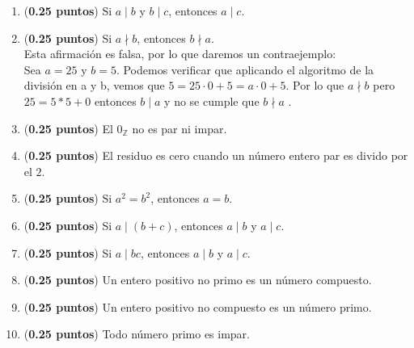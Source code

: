 \documentclass[fontsize=12pt]{scrartcl}
\begin{document}
\begin{enumerate}
		\item ({\bf 0.25 puntos})
		Si $a \mid b$ y $b \mid c$, entonces $a \mid c$.

		\item ({\bf 0.25 puntos})
		  Si $a \nmid b$, entonces $b \nmid a$. \\
                  Esta afirmación es falsa, por lo que daremos un contraejemplo: \\
                  Sea $a=25$ y  $b=5$. Podemos verificar que aplicando el algoritmo de la división en a y b, vemos que $5 = 25 \cdot 0 + 5 = a \cdot 0 +5 $. Por lo que $a \nmid b$ pero $25 = 5 * 5 +0$ entonces $b \mid a$ y no se cumple que  $b \nmid a$ .
		
		\item ({\bf 0.25 puntos})
		El $0_{\mathbb{Z}}$ no es par ni impar.
		
		\item ({\bf 0.25 puntos})
		El residuo es cero cuando un n\'umero entero par es divido por el $2$.
		
		\item ({\bf 0.25 puntos})
		Si $a^{2} = b^{2}$, entonces $a = b$.
		
		\item ({\bf 0.25 puntos})
		Si $a \mid (b + c)$, entonces $a \mid b$ y $a \mid c$.
		
		\item ({\bf 0.25 puntos})
		Si $a \mid bc$, entonces $a \mid b$ y $a \mid c$.

		\item ({\bf 0.25 puntos})
		Un entero positivo no primo es un n\'umero compuesto.
		
		\item ({\bf 0.25 puntos})
		Un entero positivo no compuesto es un n\'umero primo.
		
		\item ({\bf 0.25 puntos})
		Todo n\'umero primo es impar.


\end{enumerate}
\end{document}
